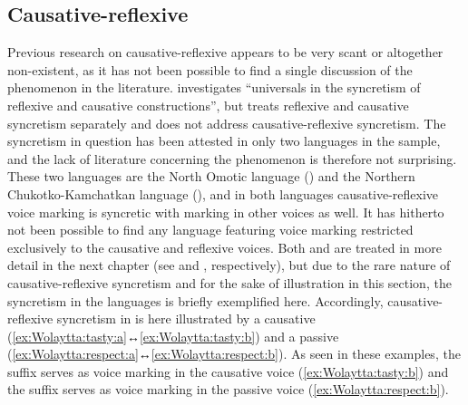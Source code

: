 \subsection{Causative-reflexive} \label{sec:simple-syncretism:caus-refl}
Previous research on causative-reflexive appears to be very scant or altogether non-existent, as it has not been possible to find a single discussion of the phenomenon in the literature. \citet{pederson:1991} investigates “universals in the syncretism of reflexive and causative constructions”, but treats reflexive and causative syncretism separately and does not address causative-reflexive syncretism. The syncretism in question has been attested in only two languages in the sample, and the lack of literature concerning the phenomenon is therefore not surprising. These two languages are the North Omotic language  () and the Northern Chukotko-Kamchatkan language  (), and in both languages causative-reflexive voice marking is syncretic with marking in other voices as well. It has hitherto not been possible to find any language featuring voice marking restricted exclusively to the causative and reflexive voices. Both  and  are treated in more detail in the next chapter (see  and , respectively), but due to the rare nature of causative-reflexive syncretism and for the sake of illustration in this section, the syncretism in the languages is briefly exemplified here. Accordingly, causative-reflexive syncretism in  is here illustrated by a causative  (\ref{ex:Wolaytta:tasty:a}↔\ref{ex:Wolaytta:tasty:b}) and a passive  (\ref{ex:Wolaytta:respect:a}↔\ref{ex:Wolaytta:respect:b}). As seen in these examples, the suffix  serves as voice marking in the causative voice (\ref{ex:Wolaytta:tasty:b}) and the suffix  serves as voice marking in the passive voice (\ref{ex:Wolaytta:respect:b}).

